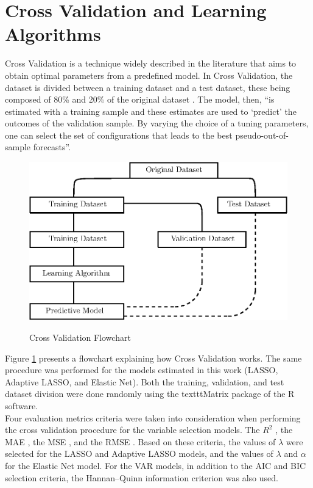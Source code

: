 \section{Cross Validation and Learning Algorithms}

Cross Validation is a technique widely described in the literature \cite[]{hoornweg2018science, hastie2009elements, stone1974cross, breiman1992submodel} that aims to obtain optimal parameters from a predefined model. In Cross Validation, the dataset is divided between a training dataset and a test dataset, these being composed of 80\% and 20\% of the original dataset \cite[291]{breiman1992submodel}. The model, then, ``is estimated with a training sample and these estimates are used to ‘predict’ the outcomes of the validation sample. By varying the choice of a tuning parameters, one can select the set of configurations that leads to the best pseudo-out-of-sample forecasts''\cite[p.136]{hoornweg2018science}.\\

\begin{figure}[!h]
    \centering
    \caption{Cross Validation Flowchart}
    \includegraphics[width=.6\textwidth]{images/validation.eps}
    \label{fig:cv}
\end{figure}


Figure \ref{fig:cv} presents a flowchart explaining how Cross Validation works. The same procedure was performed for the models estimated in this work (LASSO, Adaptive LASSO, and Elastic Net). Both the training, validation, and test dataset division were done randomly using the texttt{Matrix} \cite[]{matrix2020cran} package of the R software.\\

Four evaluation metrics criteria were taken into consideration when performing the cross validation procedure for the variable selection models. The $R^2$ \cite{heinisch1962steel}, the MAE \cite{willmott2005advantages}, the MSE \cite{bickel2015mathematical}, and the RMSE \cite{hyndman2006another}. Based on these criteria, the values of $\lambda$ were selected for the LASSO and Adaptive LASSO models, and the values of $\lambda$ and $\alpha$ for the Elastic Net model. For the VAR models, in addition to the AIC and BIC selection criteria, the Hannan–Quinn information criterion \cite{hannan1979determination} was also used.\\

